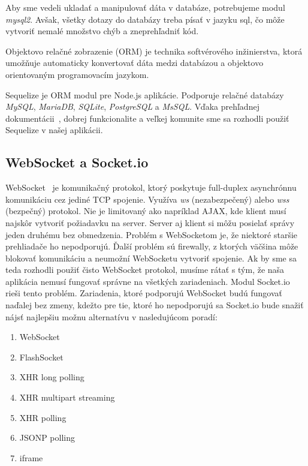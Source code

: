 Aby sme vedeli ukladať a manipulovať dáta v databáze, potrebujeme modul \textit{mysql2}.
Avšak, všetky dotazy do databázy treba písať v jazyku sql, čo môže vytvoriť nemalé
množstvo chýb a zneprehľadniť kód.

Objektovo relačné zobrazenie (ORM) je technika
softvérového inžinierstva, ktorá umožňuje automaticky
konvertovať dáta medzi databázou a objektovo orientovaným programovacím jazykom.
~\cite{bib:orm}

Sequelize je ORM modul pre Node.js aplikácie. Podporuje relačné databázy \textit{MySQL},
\textit{MariaDB}, \textit{SQLite}, \textit{PostgreSQL} a \textit{MsSQL}.
Vďaka prehľadnej dokumentácii~\cite{bib:sequelizedocs}, dobrej funkcionalite a veľkej
komunite sme sa rozhodli použiť Sequelize v našej aplikácii.

\subsection{WebSocket a Socket.io}
\label{sec:nodejs:socketio}

WebSocket~\cite{bib:fette2011websocket} je komunikačný protokol, ktorý poskytuje full-duplex asynchrónnu komunikáciu cez
jediné TCP spojenie. Využíva \textit{ws} (nezabezpečený) alebo \textit{wss} (bezpečný)
protokol. Nie je limitovaný ako napríklad AJAX, kde klient musí najskôr vytvoriť
požiadavku na server. Server aj klient si môžu posielať správy jeden druhému bez
obmedzenia. Problém s WebSocketom je, že niektoré staršie prehliadače ho nepodporujú.
Ďalší problém sú firewally, z ktorých väčšina môže blokovať komunikáciu a neumožní
WebSocketu vytvoriť spojenie. Ak by sme sa teda rozhodli použiť čisto WebSocket
protokol, musíme rátať s tým, že naša aplikácia nemusí fungovať správne na všetkých
zariadeniach. Modul Socket.io rieši tento problém. Zariadenia, ktoré
podporujú WebSocket budú fungovať naďalej bez zmeny, kdežto pre tie, ktoré ho
nepodporujú sa Socket.io bude snažiť nájsť najlepšiu možnu alternatívu v
nasledujúcom poradí:
\begin{enumerate}
	\item WebSocket
	\item FlashSocket
	\item XHR long polling
	\item XHR multipart streaming
	\item XHR polling
	\item JSONP polling
	\item iframe
\end{enumerate}

